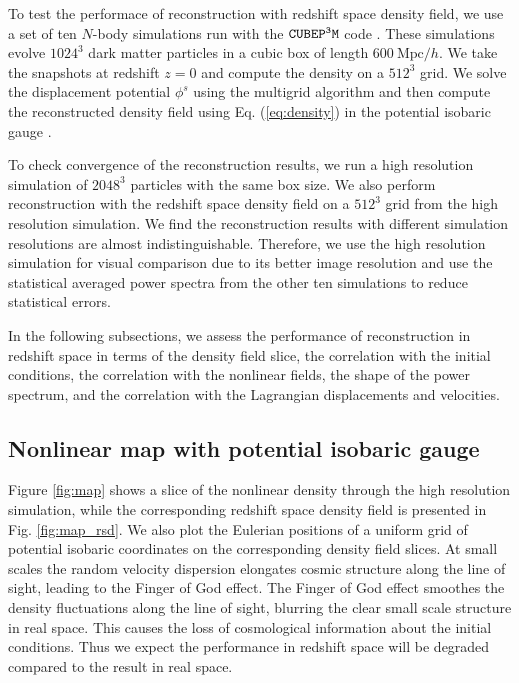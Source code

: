 \documentclass[aps,prx,twocolumn,superscriptaddress,groupedaddress,nofootinbib,amsfont]{revtex4}  %
\newcommand{\mr}{\mathrm}
\begin{document}
To test the performace of reconstruction with redshift space density field, 
we use a set of ten $N$-body simulations run with the ${\tt CUBEP^3M}$ code 
\cite{2013code}. These simulations evolve $1024^3$ dark matter particles in 
a cubic box of length $600\ \mr{Mpc}/h$.
We take the snapshots at redshift $z=0$ and compute the density on a $512^3$ 
grid. We solve the displacement potential $\phi^s$ using the multigrid algorithm
and then compute the reconstructed density field using Eq. (\ref{eq:density}) 
in the potential isobaric gauge \cite{2016HMZ}.

To check convergence of the reconstruction results, we run a high resolution
simulation of $2048^3$ particles with the same box size. 
We also perform reconstruction with the redshift space density field on a $512^3$ grid from the high resolution simulation. We find the reconstruction results 
with different simulation resolutions are almost indistinguishable. 
Therefore, we use the high resolution simulation for visual comparison due to
its better image resolution and use the statistical averaged power spectra from
the other ten simulations to reduce statistical errors.

In the following subsections, we assess the performance of reconstruction in 
redshift space in terms of the density field slice, the correlation with the
initial conditions, the correlation with the nonlinear fields, the shape of 
the power spectrum, and the correlation with the Lagrangian displacements and 
velocities.

\subsection{Nonlinear map with potential isobaric gauge}

Figure \ref{fig:map} shows a slice of the nonlinear density through the high
resolution simulation, while the corresponding redshift space density field is 
presented in Fig. \ref{fig:map_rsd}.
We also plot the Eulerian positions of a uniform grid of potential isobaric 
coordinates on the corresponding density field slices.
At small scales the random velocity dispersion elongates cosmic structure 
along the line of sight, leading to the Finger of God effect.
The Finger of God effect smoothes the density fluctuations along the line of 
sight, blurring the clear small scale structure in real space.
This causes the loss of cosmological information about the initial conditions.
Thus we expect the performance in redshift space will be degraded compared to
the result in real space.
\end{document}
